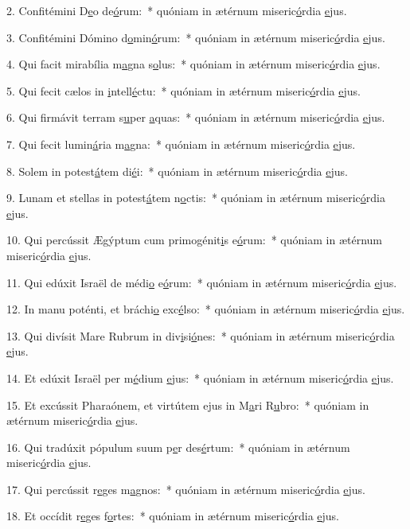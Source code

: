 2. Confitémini D\uline{e}o de\uline{ó}rum:~* quóniam in ætérnum miseric\uline{ó}rdia \uline{e}jus.\par 
3. Confitémini Dómino d\uline{o}min\uline{ó}rum:~* quóniam in ætérnum miseric\uline{ó}rdia \uline{e}jus.\par 
4. Qui facit mirabília m\uline{a}gna s\uline{o}lus:~* quóniam in ætérnum miseric\uline{ó}rdia \uline{e}jus.\par 
5. Qui fecit cælos in \uline{i}ntell\uline{é}ctu:~* quóniam in ætérnum miseric\uline{ó}rdia \uline{e}jus.\par 
6. Qui firmávit terram s\uline{u}per \uline{a}quas:~* quóniam in ætérnum miseric\uline{ó}rdia \uline{e}jus.\par 
7. Qui fecit lumin\uline{á}ria m\uline{a}gna:~* quóniam in ætérnum miseric\uline{ó}rdia \uline{e}jus.\par 
8. Solem in potest\uline{á}tem di\uline{é}i:~* quóniam in ætérnum miseric\uline{ó}rdia \uline{e}jus.\par 
9. Lunam et stellas in potest\uline{á}tem n\uline{o}ctis:~* quóniam in ætérnum miseric\uline{ó}rdia \uline{e}jus.\par 
10. Qui percússit Ægýptum cum primogénit\uline{i}s e\uline{ó}rum:~* quóniam in ætérnum miseric\uline{ó}rdia \uline{e}jus.\par 
11. Qui edúxit Israël de médi\uline{o} e\uline{ó}rum:~* quóniam in ætérnum miseric\uline{ó}rdia \uline{e}jus.\par 
12. In manu poténti, et bráchi\uline{o} exc\uline{é}lso:~* quóniam in ætérnum miseric\uline{ó}rdia \uline{e}jus.\par 
13. Qui divísit Mare Rubrum in div\uline{i}si\uline{ó}nes:~* quóniam in ætérnum miseric\uline{ó}rdia \uline{e}jus.\par 
14. Et edúxit Israël per m\uline{é}dium \uline{e}jus:~* quóniam in ætérnum miseric\uline{ó}rdia \uline{e}jus.\par 
15. Et excússit Pharaónem, et virtútem ejus in M\uline{a}ri R\uline{u}bro:~* quóniam in ætérnum miseric\uline{ó}rdia \uline{e}jus.\par 
16. Qui tradúxit pópulum suum p\uline{e}r des\uline{é}rtum:~* quóniam in ætérnum miseric\uline{ó}rdia \uline{e}jus.\par 
17. Qui percússit r\uline{e}ges m\uline{a}gnos:~* quóniam in ætérnum miseric\uline{ó}rdia \uline{e}jus.\par 
18. Et occídit r\uline{e}ges f\uline{o}rtes:~* quóniam in ætérnum miseric\uline{ó}rdia \uline{e}jus.\par 
